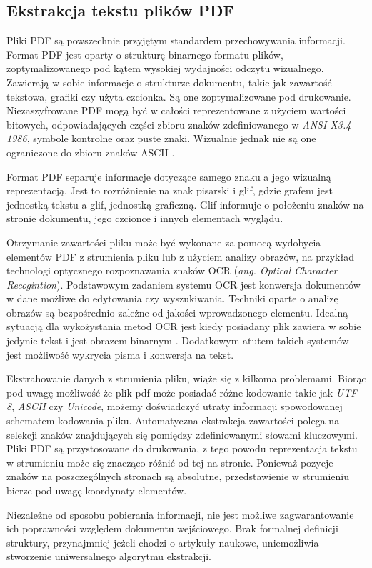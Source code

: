 \documentclass[12pt,a4paper,twoside]{article}
\begin{document}
\subsection{Ekstrakcja tekstu plików PDF}
Pliki PDF są powszechnie przyjętym standardem przechowywania informacji. Format PDF jest oparty o strukturę binarnego formatu plików, zoptymalizowanego pod kątem wysokiej wydajności odczytu wizualnego. Zawierają w sobie informacje o strukturze dokumentu, takie jak zawartość tekstowa, grafiki czy użyta czcionka. Są one zoptymalizowane pod drukowanie. Niezaszyfrowane PDF mogą być w całości reprezentowane z użyciem wartości bitowych, odpowiadających części zbioru znaków zdefiniowanego w \textit{ANSI X3.4-1986}, symbole kontrolne oraz puste znaki. Wizualnie jednak nie są one ograniczone do zbioru znaków ASCII \cite{ISO32000}.\par
Format PDF separuje informacje dotyczące samego znaku a jego wizualną reprezentacją. Jest to rozróżnienie na znak pisarski i glif, gdzie grafem jest jednostką tekstu a glif, jednostką graficzną. Glif informuje o położeniu znaków na stronie dokumentu, jego czcionce i innych elementach wyglądu. \par
Otrzymanie zawartości pliku może być wykonane za pomocą wydobycia elementów PDF z strumienia pliku lub z użyciem analizy obrazów, na przykład technologi optycznego rozpoznawania znaków OCR (\textit{ang. Optical Character Recogintion}). 
Podstawowym zadaniem systemu OCR jest konwersja dokumentów w dane możliwe do edytowania czy wyszukiwania. Techniki oparte o analizę obrazów są bezpośrednio zależne od jakości wprowadzonego elementu. Idealną sytuacją dla wykożystania metod OCR jest kiedy posiadany plik zawiera w sobie jedynie tekst i jest obrazem binarnym \cite{mithe2013optical}. Dodatkowym atutem takich systemów jest możliwość wykrycia pisma i konwersja na tekst.\par
Ekstrahowanie danych z strumienia pliku, wiąże się z kilkoma problemami. Biorąc pod uwagę możliwość że plik pdf może posiadać różne kodowanie takie jak \textit{UTF-8}, \textit{ASCII} czy \textit{Unicode}, możemy doświadczyć utraty informacji spowodowanej schematem kodowania pliku. Automatyczna ekstrakcja zawartości polega na selekcji znaków znajdujących się pomiędzy zdefiniowanymi słowami kluczowymi. Pliki PDF są przystosowane do drukowania, z tego powodu reprezentacja tekstu w strumieniu może się znacząco różnić od tej na stronie. Ponieważ pozycje znaków na poszczególnych stronach są absolutne, przedstawienie w strumieniu bierze pod uwagę koordynaty elementów.\par
Niezależne od sposobu pobierania informacji, nie jest możliwe zagwarantowanie ich poprawności względem dokumentu wejściowego. Brak formalnej definicji struktury, przynajmniej jeżeli chodzi o artykuły naukowe, uniemożliwia stworzenie uniwersalnego algorytmu ekstrakcji.
\end{document}
